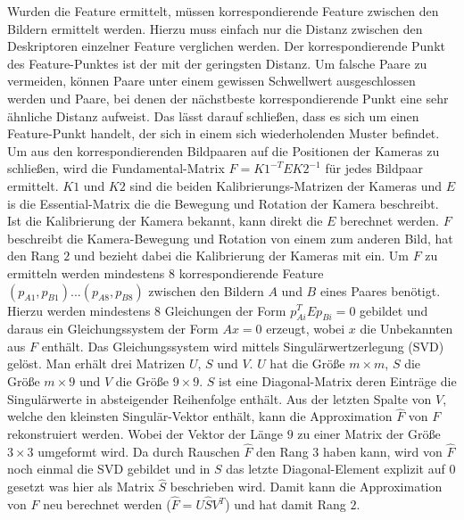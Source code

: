 \documentclass[12pt,titlepage, twoside]{article}
\begin{document}
Wurden die Feature ermittelt, müssen korrespondierende Feature zwischen den Bildern ermittelt werden. Hierzu muss einfach nur die Distanz zwischen den Deskriptoren einzelner Feature verglichen werden. 
Der korrespondierende Punkt des Feature-Punktes ist der mit der geringsten Distanz. Um falsche Paare zu vermeiden, können Paare unter einem gewissen Schwellwert ausgeschlossen werden und 
Paare, bei denen der nächstbeste korrespondierende Punkt eine sehr ähnliche Distanz aufweist. Das lässt darauf schließen, dass es sich um einen Feature-Punkt handelt, der sich in einem sich wiederholenden Muster befindet.
Um aus den korrespondierenden Bildpaaren auf die Positionen der Kameras zu schließen, wird die Fundamental-Matrix $F=K1^{-T}EK2^{-1}$ für jedes Bildpaar ermittelt. 
$K1$ und $K2$ sind die beiden Kalibrierungs-Matrizen der Kameras und $E$ is die Essential-Matrix die die Bewegung und Rotation der Kamera beschreibt.
Ist die Kalibrierung der Kamera bekannt, kann direkt die $E$ berechnet werden.
$F$ beschreibt die Kamera-Bewegung und Rotation von einem zum anderen Bild, hat den Rang $2$ und bezieht dabei die Kalibrierung der Kameras mit ein.
Um $F$ zu ermitteln werden mindestens $8$ korrespondierende Feature $(p_{A1},p_{B1})...(p_{A8},p_{B8})$ zwischen den Bildern $A$ und $B$ eines Paares benötigt. 
Hierzu werden mindestens $8$ Gleichungen der Form $p_{Ai}^TEp_{Bi}=0$ gebildet und daraus ein Gleichungssystem der Form $Ax=0$ erzeugt, wobei $x$ die Unbekannten aus $F$ enthält.
Das Gleichungssystem wird mittels Singulärwertzerlegung (SVD) gelöst. Man erhält drei Matrizen $U$, $S$ und $V$. $U$ hat die Größe $m\times m$, $S$ die Größe $m\times 9$ und $V$ die Größe $9\times 9$.
$S$ ist eine Diagonal-Matrix deren Einträge die Singulärwerte in absteigender Reihenfolge enthält.
Aus der letzten Spalte von $V$, welche den kleinsten Singulär-Vektor enthält, kann die Approximation $\hat{F}$ von $F$ rekonstruiert werden. 
Wobei der Vektor der Länge $9$ zu einer Matrix der Größe $3\times3$ umgeformt wird.
Da durch Rauschen $\hat{F}$ den Rang $3$ haben kann, wird von $\hat{F}$ noch einmal die SVD gebildet und in $S$ das letzte Diagonal-Element explizit auf $0$ gesetzt was hier als Matrix $\hat{S}$ beschrieben wird.
Damit kann die Approximation von $F$ neu berechnet werden ($\hat{F} = U\hat{S}V^T$) und hat damit Rang $2$.
\end{document}
